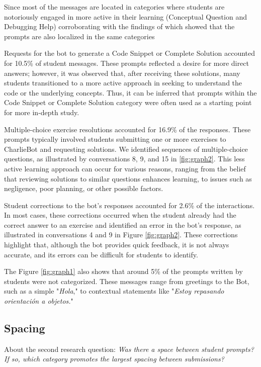 \documentclass[a4paper,twoside]{article}
\begin{document}
Since most of the messages are located in categories where students are
notoriously engaged in more active in their learning (Conceptual Question and
Debugging Help) corroborating with the findings of \cite{Ghimire24} which showed
that the prompts are also localized in the same categories

Requests for the bot to generate a Code Snippet or Complete Solution accounted
for 10.5\% of student messages. These prompts reflected a desire for more
direct answers; however, it was observed that, after receiving these solutions,
many students transitioned to a more active approach in seeking to understand
the code or the underlying concepts. Thus, it can be inferred that prompts
within the Code Snippet or Complete Solution category were often used as a
starting point for more in-depth study.

Multiple-choice exercise resolutions accounted for 16.9\% of the responses.
These prompts typically involved students submitting one or more exercises to
CharlieBot and requesting solutions. We identified sequences of multiple-choice
questions, as illustrated by conversations 8, 9, and 15 in \ref{fig:graph2}.
This less active learning approach can occur for various reasons, ranging from
the belief that reviewing solutions to similar questions enhances learning, to
issues such as negligence, poor planning, or other possible factors.

Student corrections to the bot’s responses accounted for 2.6\% of the
interactions. In most cases, these corrections occurred when the student already
had the correct answer to an exercise and identified an error in the bot’s
response, as illustrated in conversations 4 and 9 in Figure \ref{fig:graph2}.
These corrections highlight that, although the bot provides quick feedback, it
is not always accurate, and its errors can be difficult for students to
identify.

The Figure \ref{fig:graph1} also shows that around 5\% of the prompts written by
students were not categorized. These messages range from greetings to the Bot,
such as a simple "\textit{Hola}," to contextual statements like
"\textit{Estoy repasando orientación a objetos.}"

\subsection{Spacing}


About the second research question: \textit{Was there a space between student
prompts? If so, which category promotes the largest spacing between
submissions?}
\end{document}
